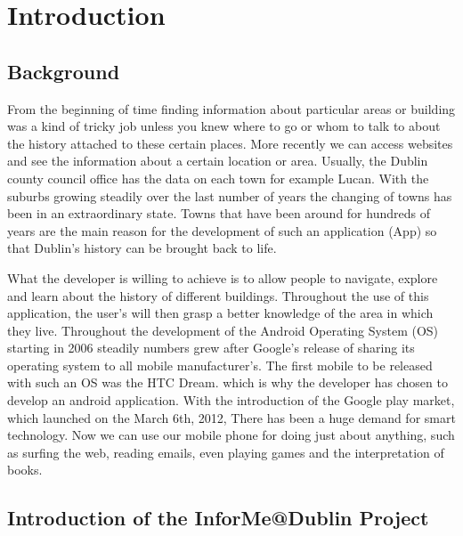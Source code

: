 \chapter{Introduction}

\section{Background}
From the beginning of time finding information about particular areas or building was a kind of tricky job unless you knew where to go or whom to talk to about the history attached to these certain places. More recently we can access websites and see the information about a certain location or area. Usually, the Dublin county council office has the data on each town for example Lucan. With the suburbs growing steadily over the last number of years the changing of towns has been in an extraordinary state. Towns that have been around for hundreds of years are the main reason for the development of such an application (App) so that Dublin's history can be brought back to life.
\par
What the developer is willing to achieve is to allow people to navigate, explore and learn about the history of different buildings. Throughout the use of this application, the user's will then grasp a better knowledge of the area in which they live.
Throughout the development of the Android Operating System (OS) starting in 2006 steadily numbers grew after Google's release of sharing its operating system to all mobile manufacturer's. The first mobile to be released with such an OS was the HTC Dream.\cite{androidHtc}  which is why the developer has chosen to develop an android application.
With the introduction of the Google play market, which launched on the March 6th,  2012, There has been a huge demand for smart technology. Now we can use our mobile phone for doing just about anything, such as surfing the web, reading emails, even playing games and the interpretation of books. 


\section{Introduction of the InforMe@Dublin Project}

